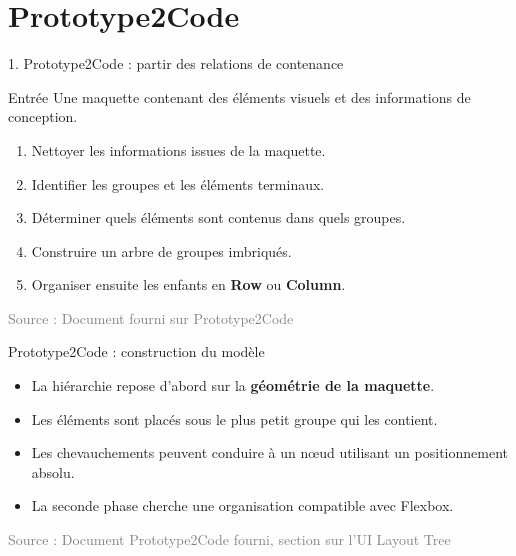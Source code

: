 \documentclass[aspectratio=169,11pt]{beamer}
\newcommand{\source}[1]{\scriptsize\textcolor{gray}{Source : #1}}
\begin{document}
\section{Prototype2Code}

\begin{frame}{1. Prototype2Code : partir des relations de contenance}
\begin{block}{Entrée}
Une maquette contenant des éléments visuels et des informations de conception.
\end{block}

\begin{enumerate}
  \item Nettoyer les informations issues de la maquette.
  \item Identifier les groupes et les éléments terminaux.
  \item Déterminer quels éléments sont contenus dans quels groupes.
  \item Construire un arbre de groupes imbriqués.
  \item Organiser ensuite les enfants en \textbf{Row} ou \textbf{Column}.
\end{enumerate}

\source{Document fourni sur Prototype2Code}
\end{frame}

\begin{frame}{Prototype2Code : construction du modèle}
\centering
{}

\vspace{0.5cm}
\begin{itemize}
  \item La hiérarchie repose d'abord sur la \textbf{géométrie de la maquette}.
  \item Les éléments sont placés sous le plus petit groupe qui les contient.
  \item Les chevauchements peuvent conduire à un nœud utilisant un positionnement absolu.
  \item La seconde phase cherche une organisation compatible avec Flexbox.
\end{itemize}

\source{Document Prototype2Code fourni, section sur l'UI Layout Tree}
\end{frame}
\end{document}
